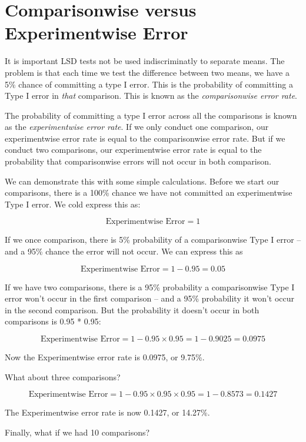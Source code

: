 \documentclass[
]{book}
\begin{document}
\hypertarget{comparisonwise-versus-experimentwise-error}{%
\section{Comparisonwise versus Experimentwise Error}\label{comparisonwise-versus-experimentwise-error}}

It is important LSD tests not be used indiscriminatly to separate means. The problem is that each time we test the difference between two means, we have a 5\% chance of committing a type I error. This is the probability of committing a Type I error in \emph{that} comparison. This is known as the \emph{comparisonwise error rate}.

The probability of committing a type I error across all the comparisons is known as the \emph{experimentwise error rate}. If we only conduct one comparison, our experimentwise error rate is equal to the comparisonwise error rate. But if we conduct two comparisons, our experimentwise error rate is equal to the probability that comparisonwise errors will not occur in both comparison.

We can demonstrate this with some simple calculations. Before we start our comparisons, there is a 100\% chance we have not committed an experimentwise Type I error. We cold express this as:

\[ \text{Experimentwise Error} = 1 \]

If we once comparison, there is 5\% probability of a comparisonwise Type I error -- and a 95\% chance the error will not occur. We can express this as

\[ \text{Experimentwise Error} = 1 - 0.95 = 0.05 \]

If we have two comparisons, there is a 95\% probability a comparisonwise Type I error won't occur in the first comparison -- and a 95\% probability it won't occur in the second comparison. But the probability it doesn't occur in both comparisons is 0.95 * 0.95:

\[ \text{Experimentwise Error} = 1 - 0.95 \times 0.95 = 1 - 0.9025 = 0.0975  \]

Now the Experimentwise error rate is 0.0975, or 9.75\%.

What about three comparisons?

\[ \text{Experimentwise Error} = 1 - 0.95 \times 0.95 \times 0.95 = 1 - 0.8573 = 0.1427 \]

The Experimentwise error rate is now 0.1427, or 14.27\%.

Finally, what if we had 10 comparisons?
\end{document}
